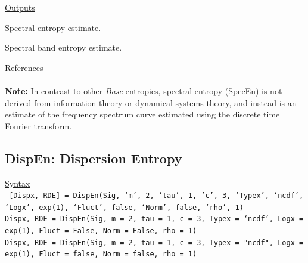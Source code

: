 \documentclass[12pt, a4paper, titlepage, openany]{book}
\begin{document}
\noindent \ul{Outputs}
\begin{description}[labelsep=1cm, labelwidth=2cm, nosep, style=multiline,leftmargin=3cm]\footnotesize
\item[\texttt{Spec}]		Spectral entropy estimate.
\item[\texttt{BandEn}]		Spectral band entropy estimate.
\end{description}

\noindent \ul{References}\hspace{1cm}
\cite{Spec1} \cite{Spec2}
\\ \ \\
\noindent\ul{\textbf{Note:}}\hspace{5mm} In contrast to other \textit{Base} entropies, spectral entropy (SpecEn) is not derived from information theory or dynamical systems theory, and instead is an estimate of the frequency spectrum curve estimated using the discrete time Fourier transform.



\newpage
\subsection{\normalsize DispEn: \hspace{15mm} Dispersion Entropy} \label{DispEn}
\noindent\ul{Syntax} \vspace{6mm} \\ \noindent \texttt{\footnotesize
[Dispx, RDE] = DispEn(Sig, ‘m’, 2, ‘tau’, 1, 'c', 3, ‘Typex’, ‘ncdf’, ‘Logx’, exp(1), ‘Fluct’, false, ‘Norm’, false, ‘rho’, 1)\\
 Dispx, RDE  = DispEn(Sig, m = 2, tau = 1, c = 3, Typex = ‘ncdf’, Logx = exp(1), Fluct = False, Norm = False, rho = 1) \\
 Dispx, RDE  = DispEn(Sig, m = 2, tau = 1, c = 3, Typex = "ncdf", Logx = exp(1), Fluct = false, Norm = false, rho = 1)}
\end{document}
